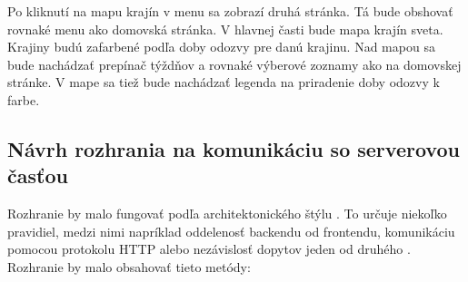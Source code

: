 Po kliknutí na mapu krajín v menu sa zobrazí druhá stránka. Tá bude obshovať rovnaké menu ako domovská stránka. V hlavnej časti bude mapa krajín sveta. 
Krajiny budú zafarbené podľa doby odozvy pre danú krajinu. Nad mapou sa bude nachádzať prepínač týždňov a rovnaké výberové zoznamy ako na domovskej stránke. 
V mape sa tiež bude nachádzať legenda na priradenie doby odozvy k farbe.

\subsection{Návrh rozhrania na komunikáciu so serverovou časťou}
Rozhranie by malo fungovať podľa architektonického štýlu . To určuje niekoľko pravidiel, medzi nimi napríklad oddelenosť backendu od frontendu, 
komunikáciu pomocou protokolu HTTP alebo nezávislosť dopytov jeden od druhého \cite{rest}. Rozhranie by malo obsahovať tieto metódy:
